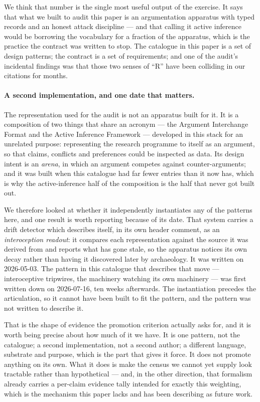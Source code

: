 We think that number is the single most useful output of the exercise.  It says
that what we built to audit this paper is an argumentation apparatus with typed
records and an honest attack discipline --- and that calling it active inference
would be borrowing the vocabulary for a fraction of the apparatus, which is the
practice the contract was written to stop.  The catalogue in this paper is a set
of design patterns; the contract is a set of requirements; and one of the
audit's incidental findings was that those two senses of ``R'' have been
colliding in our citations for months.

\paragraph{A second implementation, and one date that matters.}  The
representation used for the audit is not an apparatus built for it.  It is a
composition of two things that share an acronym --- the Argument Interchange
Format and the Active Inference Framework --- developed in this stack for an
unrelated purpose: representing the research programme to itself as an argument,
so that claims, conflicts and preferences could be inspected as data.  Its
design intent is an \emph{arena}, in which an argument competes against
counter-arguments; and it was built when this catalogue had far fewer entries
than it now has, which is why the active-inference half of the composition is
the half that never got built out.

We therefore looked at whether it independently instantiates any of the patterns
here, and one result is worth reporting because of its date.  That system carries
a drift detector which describes itself, in its own header comment, as an
\emph{interoception readout}: it compares each representation against the source
it was derived from and reports what has gone stale, so the apparatus notices its
own decay rather than having it discovered later by archaeology.  It was written
on 2026-05-03.  The pattern in this catalogue that describes that move ---
interoceptive tripwires, the machinery watching its own machinery --- was first
written down on 2026-07-16, ten weeks afterwards.  The instantiation precedes the
articulation, so it cannot have been built to fit the pattern, and the pattern
was not written to describe it.

That is the shape of evidence the promotion criterion actually asks for, and it
is worth being precise about how much of it we have.  It is one pattern, not the
catalogue; a second implementation, not a second author; a different language,
substrate and purpose, which is the part that gives it force.  It does not
promote anything on its own.  What it does is make the census we cannot yet
supply look tractable rather than hypothetical --- and, in the other direction,
that formalism already carries a per-claim evidence tally intended for exactly
this weighting, which is the mechanism this paper lacks and has been describing
as future work.

